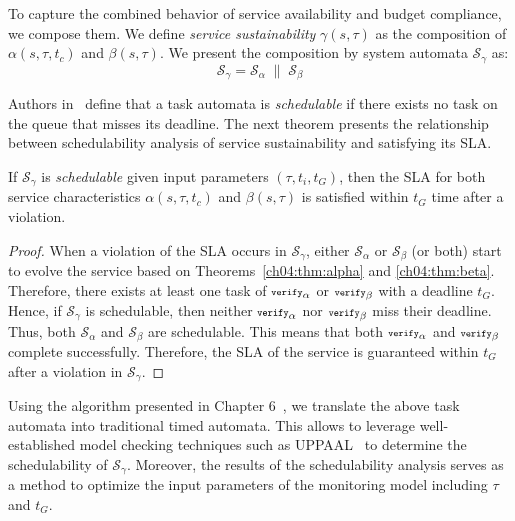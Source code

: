To capture the combined behavior of service availability and budget compliance,
we compose them. 
We define \emph{service sustainability} $\gamma(s,\tau)$ as the composition of $\alpha(s,\tau,t_c)$ and $\beta(s,\tau)$.
We present the composition by system automata $\mathcal{S}_\gamma$ as:
\[
\mathcal{S}_\gamma = \mathcal{S}_\alpha \; \parallel \; \mathcal{S}_\beta
\]

Authors in~\cite{fersman2007task} define that a task automata is \emph{schedulable} if there exists no task on the queue that misses its deadline. 
The next theorem presents the relationship between schedulability analysis of service sustainability and satisfying its SLA.

\begin{thm}
\label{ch04:thm:gamma}
If $\mathcal{S}_\gamma$ is \emph{schedulable} given input parameters $(\tau, t_i, t_G)$, then the SLA for both service characteristics $\alpha(s,\tau,t_c)$ and $\beta(s,\tau)$ is satisfied within $t_G$ time after a violation.
\end{thm}

\begin{proof}
When a violation of the SLA occurs in $\mathcal{S}_\gamma$, either $\mathcal{S}_\alpha$ or $\mathcal{S}_\beta$ (or both) start to evolve the service based on Theorems~\ref{ch04:thm:alpha} and \ref{ch04:thm:beta}.
Therefore, there exists at least one task of ${\scriptsize\texttt{verify}}_\alpha$ or ${\scriptsize\texttt{verify}}_\beta$ with a deadline $t_G$.
% 
Hence, if $\mathcal{S}_\gamma$ is schedulable, then neither ${\scriptsize\texttt{verify}}_\alpha$ nor ${\scriptsize\texttt{verify}}_\beta$ miss their deadline.
Thus, both $\mathcal{S}_\alpha$ and $\mathcal{S}_\beta$ are schedulable.
This means that both ${\scriptsize\texttt{verify}}_\alpha$ and ${\scriptsize\texttt{verify}}_\beta$ complete successfully.
Therefore, the SLA of the service is guaranteed within $t_G$ after a violation in $\mathcal{S}_\gamma$.
\end{proof}

Using the algorithm presented in Chapter 6~\cite{jaghoori2010time}, we translate the above task automata into traditional timed automata.
This allows to leverage well-established model checking techniques such as UPPAAL~\cite{uppaal2004} to determine the schedulability of $\mathcal{S}_\gamma$.
Moreover, the results of the schedulability analysis serves as a method to optimize the input parameters of the monitoring model including $\tau$ and $t_G$.